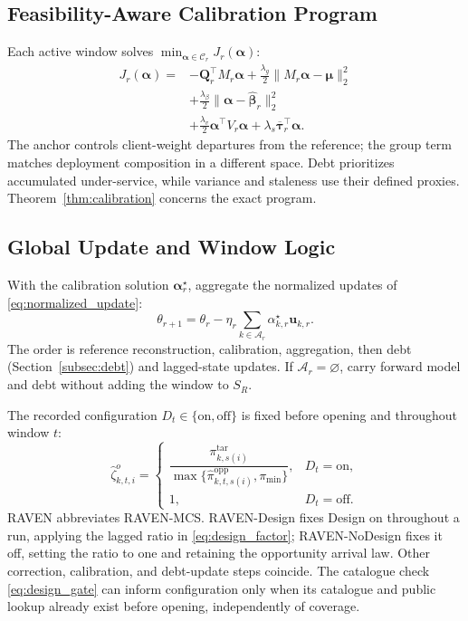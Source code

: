 \documentclass[letterpaper,journal]{IEEEtran}
\begin{document}
\subsection{Feasibility-Aware Calibration Program}
\label{subsec:P2}

Each active window solves
$\min_{\boldsymbol\alpha\in\mathcal C_r}J_r(\boldsymbol\alpha)$:
\begin{align}
 J_r(\boldsymbol\alpha)
 ={}&-\mathbf{Q}_r^{\top}M_r\boldsymbol\alpha
 +\frac{\lambda_g}{2}
 \|M_r\boldsymbol\alpha-\boldsymbol\mu\|_2^2
 \nonumber\\
 &+\frac{\lambda_{\beta}}{2}
 \|\boldsymbol\alpha-\widehat{\boldsymbol\beta}_r\|_2^2
 \nonumber\\
 &+\frac{\lambda_v}{2}
 \boldsymbol\alpha^{\top}V_r\boldsymbol\alpha
 +\lambda_s\overline{\boldsymbol\tau}_r^{\top}\boldsymbol\alpha.
\label{eq:P2_objective}
\end{align}
The anchor controls client-weight departures from the reference; the group
term matches deployment composition in a different space. Debt prioritizes
accumulated under-service, while variance and staleness use their defined
proxies. Theorem~\ref{thm:calibration} concerns the exact program.

\subsection{Global Update and Window Logic}
\label{subsec:global_update}

With the calibration solution $\boldsymbol\alpha_r^\star$, aggregate the normalized updates
of \eqref{eq:normalized_update}:
\begin{equation}
 \theta_{r+1}
 =
 \theta_r
 -
 \eta_r
 \sum_{k\in\mathcal{A}_r}
 \alpha^\star_{k,r}\mathbf{u}_{k,r}.
 \label{eq:server_update}
\end{equation}
The order is reference reconstruction, calibration, aggregation, then debt
(Section~\ref{subsec:debt}) and lagged-state updates.
If $\mathcal A_r=\varnothing$, carry forward model and debt without adding
the window to $S_R$.

The recorded configuration $D_t\in\{\mathrm{on},\mathrm{off}\}$ is fixed before
opening and throughout window $t$:
\begin{equation}
\widehat\zeta^{o}_{k,t,i}
=
\begin{cases}
\dfrac{\pi^{\mathrm{tar}}_{k,s(i)}}
{\max\{\widehat\pi^{\mathrm{opp}}_{k,t,s(i)},\pi_{\min}\}}, & D_t=\mathrm{on},\\[1.5mm]
1, & D_t=\mathrm{off}.
\end{cases}
\label{eq:design_factor}
\end{equation}
RAVEN abbreviates RAVEN-MCS. RAVEN-Design fixes Design on throughout a run,
applying the lagged ratio in \eqref{eq:design_factor}; RAVEN-NoDesign fixes it
off, setting the ratio to one and retaining the opportunity arrival law.
Other correction, calibration, and debt-update steps coincide. The catalogue check
\eqref{eq:design_gate} can inform configuration only when its catalogue and
public lookup already exist before opening, independently of coverage.
\end{document}
